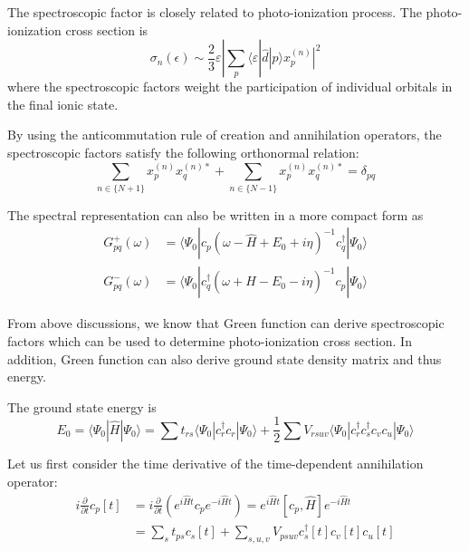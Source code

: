 The spectroscopic factor is closely related to photo-ionization process.
The photo-ionization cross section is
\begin{equation}
\sigma_{n}(\epsilon) \sim \frac{2}{3} \varepsilon|\sum_{p}\langle\varepsilon|\hat{d}| p\rangle x_{p}^{(n)}|^{2}
\end{equation}
where the spectroscopic factors weight the participation of individual orbitals in the final ionic state.

By using the anticommutation rule of creation and annihilation operators, the spectroscopic factors satisfy the following orthonormal relation:
\begin{equation}
\sum_{n \in\{N+1\}} x_{p}^{(n)} x_{q}^{(n) *}+\sum_{n \in\{N-1\}} x_{p}^{(n)} x_{q}^{(n) *}=\delta_{p q}
\end{equation}

The spectral representation can also be written in a more compact form as
\begin{equation}
\begin{aligned} G_{p q}^{+}(\omega) &=\langle\Psi_{0}|c_{p}\left(\omega-\hat{H}+E_{0}+i \eta\right)^{-1} c_{q}^{\dagger}| \Psi_{0}\rangle \\ G_{p q}^{-}(\omega) &=\langle\Psi_{0}|c_{q}^{\dagger}\left(\omega+\hat{H}-E_{0}-i \eta\right)^{-1} c_{p}| \Psi_{0}\rangle \end{aligned}
\end{equation}

From above discussions, we know that Green function can derive spectroscopic factors which can be used to determine photo-ionization cross section.
In addition, Green function can also derive ground state density matrix and thus energy.

The ground state energy is
\begin{equation}
E_{0}=\langle\Psi_{0}|\hat{H}| \Psi_{0}\rangle=\sum t_{r s}\langle\Psi_{0}|c_{r}^{\dagger} c_{r}| \Psi_{0}\rangle+\frac{1}{2} \sum V_{r s u v}\langle\Psi_{0}|c_{r}^{\dagger} c_{s}^{\dagger} c_{v} c_{u}| \Psi_{0}\rangle
\end{equation}

Let us first consider the time derivative of the time-dependent annihilation operator:
\begin{equation}
\begin{aligned}
	i \frac{\partial}{\partial t} c_{p}[t]&=i \frac{\partial}{\partial t}\left(e^{i \hat{H} t} c_{p} e^{-i \hat{H} t}\right)=e^{i \hat{H} t}\left[c_{p}, \hat{H}\right] e^{-i \hat{H} t}
	\\
	&=\sum_{s} t_{p s} c_{s}[t]+\sum_{s, u, v} V_{p s u v} c_{s}^{\dagger}[t] c_{v}[t] c_{u}[t]
\end{aligned}
\end{equation}

